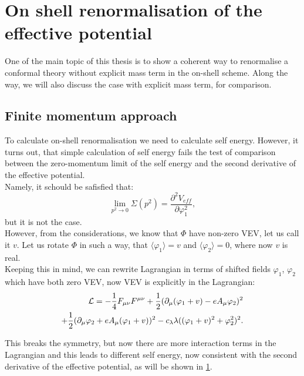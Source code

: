 \chapter{On shell renormalisation of the effective potential}

One of the main topic of this thesis is to show a coherent way to renormalise a conformal theory 
without explicit mass term in the on-shell scheme. Along the way, we will also discuss 
the case with explicit mass term, for comparison.\\

\section{Finite momentum approach}\label{finite momentum}
To calculate on-shell renormalisation we need to calculate self energy. 
However, it turns out, that simple calculation of self energy fails the test of 
comparison between the zero-momentum limit of the self energy and the second derivative 
of the effective potential. \\
Namely, it schould be safisfied that:
\begin{equation}\label{second_derivativ_condition}
\lim\limits_{p^2\to 0}\Sigma(p^2)=\frac{\partial^2V_{eff}}{\partial\varphi_1^2},
\end{equation}
but it is not the case. \\

However, from the \MSbar considerations, we know that $\Phi$ have non-zero VEV, let us 
call it $v$. 
Let us rotate $\Phi$ in such a way, that $\langle\varphi_1\rangle=v$ and $\langle\varphi_2\rangle 
= 0$, where now $v$ is real. \\
Keeping this in mind, we can rewrite Lagrangian in terms of shifted fields $\varphi_1$, 
$\varphi_2$ which have both zero VEV, now VEV is explicitly in the Lagrangian:
\begin{align}\label{no_mass_term}
\mathcal{L} = -\frac{1}{4}F_{\mu\nu}F^{\mu\nu}+ 
\frac{1}{2}(\partial_\mu(\varphi_1+v) - eA_\mu\varphi_2)^2\\
+\frac{1}{2}(\partial_\mu\varphi_2+eA_\mu(\varphi_1+v))^2
-c_\lambda\lambda((\varphi_1+v)^2+\varphi_2^2)^2. \notag
\end{align}

This breaks the symmetry, but now there are more interaction terms in the Lagrangian and this leads 
to different self energy, now consistent with the second derivative of the effective potential, 
as will be shown in \ref{}. \\ 


